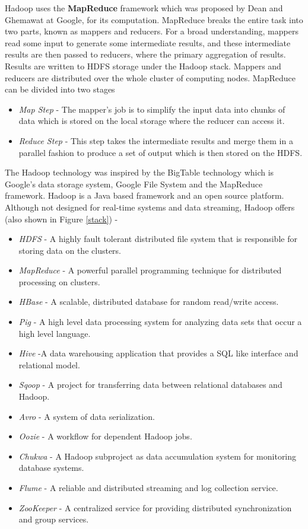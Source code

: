 \documentclass[journal]{IEEEtran}
\begin{document}
Hadoop uses the \textbf{MapReduce} framework \cite{dean2008mapreduce} which was proposed by Dean and Ghemawat at Google, for its computation. MapReduce breaks the entire task into two parts, known as mappers and reducers. For a broad understanding, mappers read some input to generate some intermediate results, and these intermediate results are then passed to reducers, where the primary aggregation of results. Results are written to HDFS storage under the Hadoop stack. Mappers and reducers are distributed over the whole cluster of computing nodes. MapReduce can be divided into two stages \cite{bakshi2012considerations}
\begin{itemize}
\item \textit{Map Step} - The mapper's job is to simplify the input data into chunks of data which is stored on the local storage where the reducer can access it. \cite{6567202}  
\item \textit{Reduce Step} - This step takes the intermediate results and merge them in a parallel fashion to produce a set of output which is then stored on the HDFS. \cite{6567202}
\end{itemize}

The Hadoop technology was inspired by the BigTable technology which is Google's data storage system, Google File System and the MapReduce framework. Hadoop is a Java based framework and an open source platform. Although not designed for real-time systems and data streaming, Hadoop offers \cite{hadoop1} (also shown in Figure \ref{stack}) -
\begin{itemize}
\item \textit{HDFS} - A highly fault tolerant distributed file system that is responsible for storing data on the clusters.
\item \textit{MapReduce} - A powerful parallel programming technique for distributed processing on clusters.
\item \textit{HBase} - A scalable, distributed database for random read/write access.
\item \textit{Pig} - A high level data processing system  for analyzing data sets that occur a high level language. 
\item \textit{Hive} -A data warehousing application that provides a SQL like interface and relational model.
\item \textit{Sqoop} - A project for transferring data between 
relational databases and Hadoop.
\item \textit{Avro} - A system of data serialization.
\item \textit{Oozie} - A workflow for dependent Hadoop jobs.
\item \textit{Chukwa} - A Hadoop subproject as data accumulation system for monitoring database systems.
\item \textit{Flume} - A reliable and distributed streaming and log collection service.
\item \textit{ZooKeeper} - A centralized service for providing distributed synchronization and group services.
\end{itemize}
\end{document}
